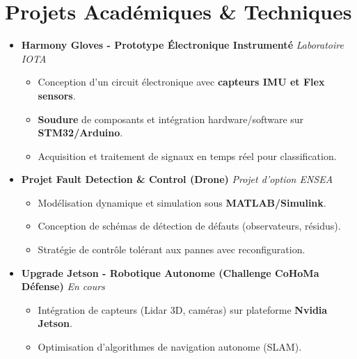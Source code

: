 \documentclass[a4paper,11pt]{article}
\begin{document}
\section{Projets Académiques \& Techniques}
\begin{itemize}[leftmargin=*, label={}]

\item \textbf{Harmony Gloves - Prototype Électronique Instrumenté} \hfill \textit{Laboratoire IOTA}
\vspace{-2pt}
    \begin{itemize}[leftmargin=0.4cm, nosep, label=\tiny$\bullet$]
        \item \small{Conception d'un circuit électronique avec \textbf{capteurs IMU et Flex sensors}.}
        \item \small{\textbf{Soudure} de composants et intégration hardware/software sur \textbf{STM32/Arduino}.}
        \item \small{Acquisition et traitement de signaux en temps réel pour classification.}
    \end{itemize}
    \vspace{3pt}

\item \textbf{Projet Fault Detection \& Control (Drone)} \hfill \textit{Projet d'option ENSEA}
\vspace{-2pt}
    \begin{itemize}[leftmargin=0.4cm, nosep, label=\tiny$\bullet$]
        \item \small{Modélisation dynamique et simulation sous \textbf{MATLAB/Simulink}.}
        \item \small{Conception de schémas de détection de défauts (observateurs, résidus).}
        \item \small{Stratégie de contrôle tolérant aux pannes avec reconfiguration.}
    \end{itemize}
    \vspace{3pt}

\item \textbf{Upgrade Jetson - Robotique Autonome (Challenge CoHoMa Défense)} \hfill \textit{En cours}
\vspace{-2pt}
    \begin{itemize}[leftmargin=0.4cm, nosep, label=\tiny$\bullet$]
        \item \small{Intégration de capteurs (Lidar 3D, caméras) sur plateforme \textbf{Nvidia Jetson}.}
        \item \small{Optimisation d'algorithmes de navigation autonome (SLAM).}
    \end{itemize}
    \vspace{3pt}


\end{itemize}
\end{document}
